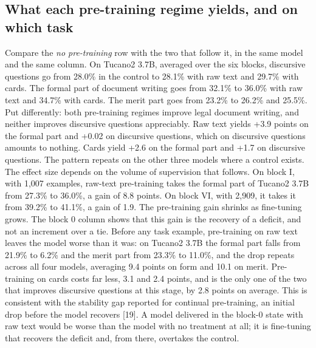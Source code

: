 \documentclass{IOS-Book-Article}
\begin{document}
\subsection{What each pre-training regime yields, and on which task}
Compare the \emph{no pre-training} row with the two that follow it, in the same model and the same column. On Tucano2 3.7B, averaged over the six blocks, discursive questions go from 28.0\% in the control to 28.1\% with raw text and 29.7\% with cards. The formal part of document writing goes from 32.1\% to 36.0\% with raw text and 34.7\% with cards. The merit part goes from 23.2\% to 26.2\% and 25.5\%.
Put differently: both pre-training regimes improve legal document writing, and neither improves discursive questions appreciably. Raw text yields +3.9 points on the formal part and +0.02 on discursive questions, which on discursive questions amounts to nothing. Cards yield +2.6 on the formal part and +1.7 on discursive questions. The pattern repeats on the other three models where a control exists. The effect size depends on the volume of supervision that follows. On block I, with 1,007 examples, raw-text pre-training takes the formal part of Tucano2 3.7B from 27.3\% to 36.0\%, a gain of 8.8 points. On block VI, with 2,909, it takes it from 39.2\% to 41.1\%, a gain of 1.9. The pre-training gain shrinks as fine-tuning grows.
The block 0 column shows that this gain is the recovery of a deficit, and not an increment over a tie. Before any task example, pre-training on raw text leaves the model worse than it was: on Tucano2 3.7B the formal part falls from 21.9\% to 6.2\% and the merit part from 23.3\% to 11.0\%, and the drop repeats across all four models, averaging 9.4 points on form and 10.1 on merit. Pre-training on cards costs far less, 3.1 and 2.4 points, and is the only one of the two that improves discursive questions at this stage, by 2.8 points on average. This is consistent with the stability gap reported for continual pre-training, an initial drop before the model recovers [19]. A model delivered in the block-0 state with raw text would be worse than the model with no treatment at all; it is fine-tuning that recovers the deficit and, from there, overtakes the control.
\end{document}
